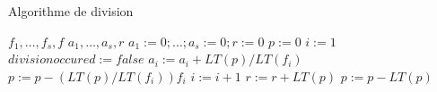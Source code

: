 \begin{algorithm}
\caption{Algorithme de division}
\begin{algorithmic}
\REQUIRE $f_1,\ldots,f_s,f$
\ENSURE $a_1,\ldots,a_s,r$
\STATE $a_1 :=0 ;\ldots ; a_s:=0 ; r:=0$
\STATE $p:=0$
\STATE $i:=1$
\STATE $divisionoccured:=false $
\STATE $a_i:= a_i+LT (p)/LT (f_i)$
\STATE $p:=p-(LT(p)/LT (f_i)) f_i$
\ELSE
\STATE $i:=i+1$
\ENDIF
\ENDWHILE
{}
\STATE $r:=r+LT (p)$
\STATE $p:=p-LT (p) $
\ENDIF
\ENDWHILE
\end{algorithmic}
\end{algorithm}